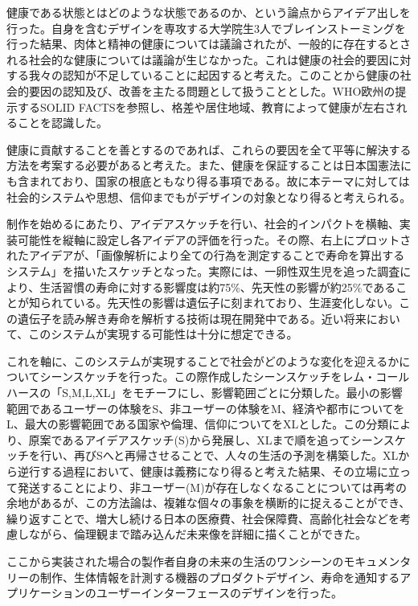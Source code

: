 \documentclass{jsarticle}
\begin{document}
健康である状態とはどのような状態であるのか、という論点からアイデア出しを行った。自身を含むデザインを専攻する大学院生3人でブレインストーミングを行った結果、肉体と精神の健康については議論されたが、一般的に存在するとされる社会的な健康については議論が生じなかった。これは健康の社会的要因に対する我々の認知が不足していることに起因すると考えた。このことから健康の社会的要因の認知及び、改善を主たる問題として扱うこととした。WHO欧州の提示するSOLID FACTSを参照し、格差や居住地域、教育によって健康が左右されることを認識した。

健康に貢献することを善とするのであれば、これらの要因を全て平等に解決する方法を考案する必要があると考えた。また、健康を保証することは日本国憲法にも含まれており、国家の根底ともなり得る事項である。故に本テーマに対しては社会的システムや思想、信仰までもがデザインの対象となり得ると考えられる。

制作を始めるにあたり、アイデアスケッチを行い、社会的インパクトを横軸、実装可能性を縦軸に設定し各アイデアの評価を行った。その際、右上にプロットされたアイデアが、「画像解析により全ての行為を測定することで寿命を算出するシステム」を描いたスケッチとなった。実際には、一卵性双生児を追った調査により、生活習慣の寿命に対する影響度は約75\%、先天性の影響が約25\%であることが知られている。先天性の影響は遺伝子に刻まれており、生涯変化しない。この遺伝子を読み解き寿命を解析する技術は現在開発中である。近い将来において、このシステムが実現する可能性は十分に想定できる。

これを軸に、このシステムが実現することで社会がどのような変化を迎えるかについてシーンスケッチを行った。この際作成したシーンスケッチをレム・コールハースの「S,M,L,XL」をモチーフにし、影響範囲ごとに分類した。最小の影響範囲であるユーザーの体験をS、非ユーザーの体験をM、経済や都市についてをL、最大の影響範囲である国家や倫理、信仰についてをXLとした。この分類により、原案であるアイデアスケッチ(S)から発展し、XLまで順を追ってシーンスケッチを行い、再びSへと再帰させることで、人々の生活の予測を構築した。XLから逆行する過程において、健康は義務になり得ると考えた結果、その立場に立って発送することにより、非ユーザー(M)が存在しなくなることについては再考の余地があるが、この方法論は、複雑な個々の事象を横断的に捉えることができ、繰り返すことで、増大し続ける日本の医療費、社会保障費、高齢化社会などを考慮しながら、倫理観まで踏み込んだ未来像を詳細に描くことができた。

ここから実装された場合の製作者自身の未来の生活のワンシーンのモキュメンタリーの制作、生体情報を計測する機器のプロダクトデザイン、寿命を通知するアプリケーションのユーザーインターフェースのデザインを行った。
\end{document}
